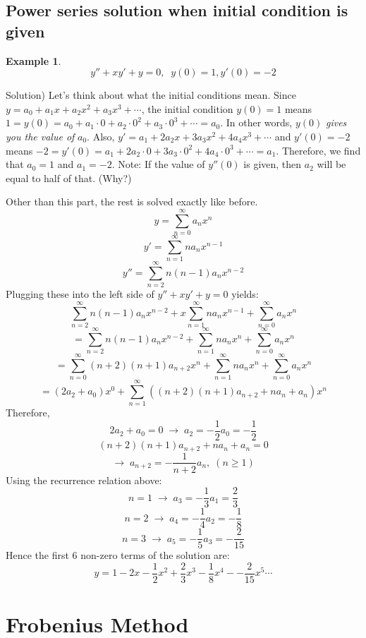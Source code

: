 \documentclass[12pt]{report}
\newtheorem{ex}{Example}[section]
\begin{document}
\subsection*{Power series solution when initial condition is given }

\begin{ex}
$$y'' + xy'+ y =0, \; \; y(0)=1, y'(0)=-2 $$
\end{ex}
Solution)
Let's think about what the initial conditions mean. Since $y=a_0 + a_1 x + a_2 x^2 +a_3 x^3 +\cdots$, the initial condition $y(0)=1$ means $1=y(0)= a_0 + a_1 \cdot 0  + a_2 \cdot 0^2 +a_3 \cdot 0^3 +\cdots = a_0$. In other words, $y(0)$ \textit{gives you the value of} $a_0$.
Also, $y' = a_1  + 2 a_2 x + 3a_3 x^2 + 4a_4 x^3 +\cdots$ and $y'(0)=-2$ means
$-2 = y'(0) = a_1  + 2 a_2 \cdot 0 + 3a_3 \cdot 0^2 + 4a_4 \cdot 0^3 +\cdots = a_1$.
Therefore, we find that $a_0=1$ and $a_1=-2$.
Note: If the value of $y''(0)$ is given, then $a_2$ will be equal to half of that. (Why?)

Other than this part, the rest is solved exactly like before.
$$y = \sum_{n=0}^{\infty} a_n x^{n} $$
$$y' = \sum_{n=1}^{\infty} n a_n x^{n-1} $$
$$y'' = \sum_{n=2}^{\infty} n (n-1) a_n x^{n-2} $$
Plugging these into the left side of $y'' + xy'+ y =0$ yields:
$$ \sum_{n=2}^{\infty} n (n-1) a_n x^{n-2} + x \sum_{n=1}^{\infty} n a_n x^{n-1}  + \sum_{n=0}^{\infty} a_n x^{n} $$
$$ = \sum_{n=2}^{\infty} n (n-1) a_n x^{n-2} +  \sum_{n=1}^{\infty} n a_n x^{n}  + \sum_{n=0}^{\infty} a_n x^{n} $$
$$ = \sum_{n=0}^{\infty} (n+2)(n+1) a_{n+2} x^{n} +  \sum_{n=1}^{\infty} n a_n x^{n}  + \sum_{n=0}^{\infty} a_n x^{n} $$
$$ = (2a_2+a_0)x^0 + \sum_{n=1}^{\infty} \left( (n+2)(n+1) a_{n+2}+n a_n+a_n \right) x^n $$
Therefore,
$$2a_2+a_0=0 \; \rightarrow \; a_2 = -\frac{1}{2}a_0 = -\frac{1}{2} $$
$$ (n+2)(n+1) a_{n+2}+n a_n+a_n =0$$
$$ \rightarrow \; a_{n+2} = -\frac{1}{n+2} a_n, \; (n\geq 1) $$
Using the recurrence relation above:
$$n=1 \; \rightarrow \; a_3 = -\frac{1}{3} a_1 = \frac{2}{3}$$
$$n=2 \; \rightarrow \; a_4 = -\frac{1}{4} a_2 = -\frac{1}{8}$$
$$n=3 \; \rightarrow \; a_5 = -\frac{1}{5} a_3 = -\frac{2}{15}$$
Hence the first 6 non-zero terms of the solution are:
$$y = 1 -2x -\frac{1}{2} x^2+ \frac{2}{3} x^3 - \frac{1}{8} x^4 -  -\frac{2}{15} x^5 \cdots $$

\section{Frobenius Method }
\end{document}

